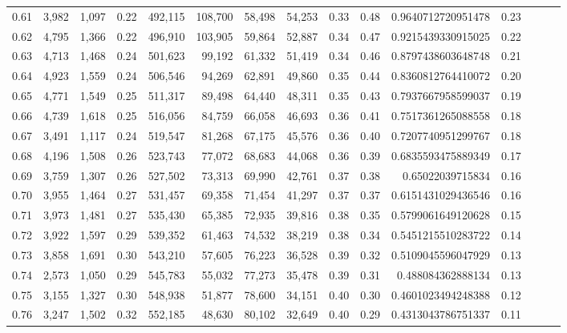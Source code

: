 \begin{tabular}{rrrrrrrrrrrrrrr}
0.61 &   3,982 &  1,097 &  0.22 &  492,115 &  108,700 &   58,498 &   54,253 &  0.33 &  0.48 &   0.9640712720951478 &      0.23 \\
0.62 &   4,795 &  1,366 &  0.22 &  496,910 &  103,905 &   59,864 &   52,887 &  0.34 &  0.47 &   0.9215439330915025 &      0.22 \\
0.63 &   4,713 &  1,468 &  0.24 &  501,623 &   99,192 &   61,332 &   51,419 &  0.34 &  0.46 &   0.8797438603648748 &      0.21 \\
0.64 &   4,923 &  1,559 &  0.24 &  506,546 &   94,269 &   62,891 &   49,860 &  0.35 &  0.44 &   0.8360812764410072 &      0.20 \\
0.65 &   4,771 &  1,549 &  0.25 &  511,317 &   89,498 &   64,440 &   48,311 &  0.35 &  0.43 &   0.7937667958599037 &      0.19 \\
0.66 &   4,739 &  1,618 &  0.25 &  516,056 &   84,759 &   66,058 &   46,693 &  0.36 &  0.41 &   0.7517361265088558 &      0.18 \\
0.67 &   3,491 &  1,117 &  0.24 &  519,547 &   81,268 &   67,175 &   45,576 &  0.36 &  0.40 &   0.7207740951299767 &      0.18 \\
0.68 &   4,196 &  1,508 &  0.26 &  523,743 &   77,072 &   68,683 &   44,068 &  0.36 &  0.39 &   0.6835593475889349 &      0.17 \\
0.69 &   3,759 &  1,307 &  0.26 &  527,502 &   73,313 &   69,990 &   42,761 &  0.37 &  0.38 &     0.65022039715834 &      0.16 \\
0.70 &   3,955 &  1,464 &  0.27 &  531,457 &   69,358 &   71,454 &   41,297 &  0.37 &  0.37 &   0.6151431029436546 &      0.16 \\
0.71 &   3,973 &  1,481 &  0.27 &  535,430 &   65,385 &   72,935 &   39,816 &  0.38 &  0.35 &   0.5799061649120628 &      0.15 \\
0.72 &   3,922 &  1,597 &  0.29 &  539,352 &   61,463 &   74,532 &   38,219 &  0.38 &  0.34 &   0.5451215510283722 &      0.14 \\
0.73 &   3,858 &  1,691 &  0.30 &  543,210 &   57,605 &   76,223 &   36,528 &  0.39 &  0.32 &   0.5109045596047929 &      0.13 \\
0.74 &   2,573 &  1,050 &  0.29 &  545,783 &   55,032 &   77,273 &   35,478 &  0.39 &  0.31 &    0.488084362888134 &      0.13 \\
0.75 &   3,155 &  1,327 &  0.30 &  548,938 &   51,877 &   78,600 &   34,151 &  0.40 &  0.30 &   0.4601023494248388 &      0.12 \\
0.76 &   3,247 &  1,502 &  0.32 &  552,185 &   48,630 &   80,102 &   32,649 &  0.40 &  0.29 &   0.4313043786751337 &      0.11 \\

\end{tabular}
